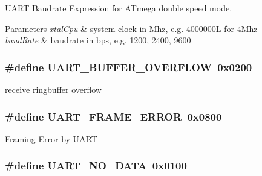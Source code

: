 U\-A\-R\-T Baudrate Expression for A\-Tmega double speed mode. 


\begin{DoxyParams}{Parameters}
{\em xtal\-Cpu} & system clock in Mhz, e.\-g. 4000000\-L for 4\-Mhz \\
\hline
{\em baud\-Rate} & baudrate in bps, e.\-g. 1200, 2400, 9600 \\
\hline
\end{DoxyParams}
\hypertarget{group__avr-uart_ga94758f3dad6864703b7417d3e40f11df}{
\subsubsection[{U\-A\-R\-T\-\_\-\-B\-U\-F\-F\-E\-R\-\_\-\-O\-V\-E\-R\-F\-L\-O\-W}]{\setlength{\rightskip}{0pt plus 5cm}\#define U\-A\-R\-T\-\_\-\-B\-U\-F\-F\-E\-R\-\_\-\-O\-V\-E\-R\-F\-L\-O\-W~0x0200}}\label{group__avr-uart_ga94758f3dad6864703b7417d3e40f11df}
receive ringbuffer overflow \hypertarget{group__avr-uart_gabcdb1041d763560cd8f8e722370dfd37}{
\subsubsection[{U\-A\-R\-T\-\_\-\-F\-R\-A\-M\-E\-\_\-\-E\-R\-R\-O\-R}]{\setlength{\rightskip}{0pt plus 5cm}\#define U\-A\-R\-T\-\_\-\-F\-R\-A\-M\-E\-\_\-\-E\-R\-R\-O\-R~0x0800}}\label{group__avr-uart_gabcdb1041d763560cd8f8e722370dfd37}
Framing Error by U\-A\-R\-T \hypertarget{group__avr-uart_ga77ba544d423ff42d400220a05303f268}{
\subsubsection[{U\-A\-R\-T\-\_\-\-N\-O\-\_\-\-D\-A\-T\-A}]{\setlength{\rightskip}{0pt plus 5cm}\#define U\-A\-R\-T\-\_\-\-N\-O\-\_\-\-D\-A\-T\-A~0x0100}}\label{group__avr-uart_ga77ba544d423ff42d400220a05303f268}
